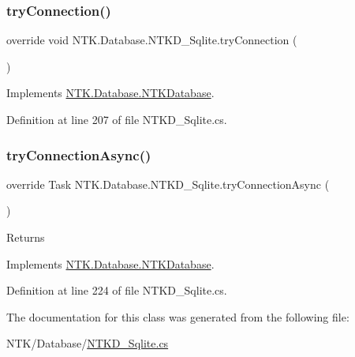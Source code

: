 \subsubsection{\texorpdfstring{tryConnection()}{tryConnection()}}
{\footnotesize\ttfamily override void N\+T\+K.\+Database.\+N\+T\+K\+D\+\_\+\+Sqlite.\+try\+Connection (\begin{DoxyParamCaption}{ }\end{DoxyParamCaption})\hspace{0.3cm}{\ttfamily [virtual]}}







Implements \mbox{\hyperlink{class_n_t_k_1_1_database_1_1_n_t_k_database_a8035cdddb04d0e90a712aa8e24abeb43}{N\+T\+K.\+Database.\+N\+T\+K\+Database}}.



Definition at line 207 of file N\+T\+K\+D\+\_\+\+Sqlite.\+cs.

\mbox{\label{class_n_t_k_1_1_database_1_1_n_t_k_d___sqlite_a328887404644a1e7c27aedfba50399d7}} 
\subsubsection{\texorpdfstring{tryConnectionAsync()}{tryConnectionAsync()}}
{\footnotesize\ttfamily override Task N\+T\+K.\+Database.\+N\+T\+K\+D\+\_\+\+Sqlite.\+try\+Connection\+Async (\begin{DoxyParamCaption}{ }\end{DoxyParamCaption})\hspace{0.3cm}{\ttfamily [virtual]}}





\begin{DoxyReturn}{Returns}

\end{DoxyReturn}


Implements \mbox{\hyperlink{class_n_t_k_1_1_database_1_1_n_t_k_database_a59d2820fbd047c1b11c73aabbf390ebb}{N\+T\+K.\+Database.\+N\+T\+K\+Database}}.



Definition at line 224 of file N\+T\+K\+D\+\_\+\+Sqlite.\+cs.



The documentation for this class was generated from the following file\+:\begin{DoxyCompactItemize}
\item 
N\+T\+K/\+Database/\mbox{\hyperlink{_n_t_k_d___sqlite_8cs}{N\+T\+K\+D\+\_\+\+Sqlite.\+cs}}\end{DoxyCompactItemize}
